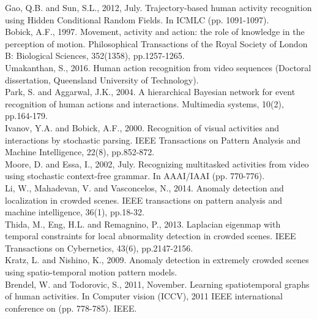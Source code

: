 \newline
[40] Gao, Q.B. and Sun, S.L., 2012, July. Trajectory-based human activity recognition using Hidden Conditional Random Fields. In ICMLC (pp. 1091-1097).\\
\newline
[41]  Bobick, A.F., 1997. Movement, activity and action: the role of knowledge in the perception of motion. Philosophical Transactions of the Royal Society of London B: Biological Sciences, 352(1358), pp.1257-1265.\\
\newline
[42] Umakanthan, S., 2016. Human action recognition from video sequences (Doctoral dissertation, Queensland University of Technology).\\
\newline
[43] Park, S. and Aggarwal, J.K., 2004. A hierarchical Bayesian network for event recognition of human actions and interactions. Multimedia systems, 10(2), pp.164-179.\\
\newline
[44] Ivanov, Y.A. and Bobick, A.F., 2000. Recognition of visual activities and interactions by stochastic parsing. IEEE Transactions on Pattern Analysis and Machine Intelligence, 22(8), pp.852-872.\\
\newline
[45] Moore, D. and Essa, I., 2002, July. Recognizing multitasked activities from video using stochastic context-free grammar. In AAAI/IAAI (pp. 770-776).\\
\newline
[46] Li, W., Mahadevan, V. and Vasconcelos, N., 2014. Anomaly detection and localization in crowded scenes. IEEE transactions on pattern analysis and machine intelligence, 36(1), pp.18-32.\\
\newline
[47] Thida, M., Eng, H.L. and Remagnino, P., 2013. Laplacian eigenmap with temporal constraints for local abnormality detection in crowded scenes. IEEE Transactions on Cybernetics, 43(6), pp.2147-2156.\\
\newline
[48] Kratz, L. and Nishino, K., 2009. Anomaly detection in extremely crowded scenes using spatio-temporal motion pattern models.\\
\newline
[49] Brendel, W. and Todorovic, S., 2011, November. Learning spatiotemporal graphs of human activities. In Computer vision (ICCV), 2011 IEEE international conference on (pp. 778-785). IEEE.\\
